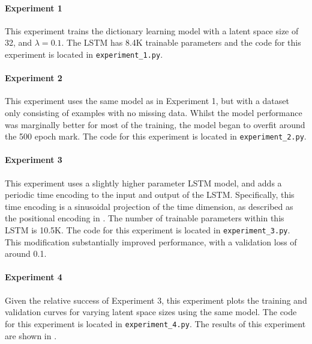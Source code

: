 \documentclass[twocolumn, 9pt]{extarticle}
\begin{document}
\paragraph{Experiment 1} This experiment trains the dictionary learning model with a latent space size of 32, and $\lambda = 0.1$. The LSTM has 8.4K trainable parameters and the code for this experiment is located in \texttt{experiment\_1.py}.

\paragraph{Experiment 2} This experiment uses the same model as in Experiment 1, but with a dataset only consisting of examples with no missing data. Whilst the model performance was marginally better for most of the training, the model began to overfit around the 500 epoch mark. The code for this experiment is located in \texttt{experiment\_2.py}.

\paragraph{Experiment 3} This experiment uses a slightly higher parameter LSTM model, and adds a periodic time encoding to the input and output of the LSTM. Specifically, this time encoding is a sinusoidal projection of the time dimension, as described as the positional encoding in \cite{vaswani2017attention}. The number of trainable parameters within this LSTM is 10.5K. The code for this experiment is located in \texttt{experiment\_3.py}. This modification substantially improved performance, with a validation loss of around 0.1.

\paragraph{Experiment 4} Given the relative success of Experiment 3, this experiment plots the training and validation curves for varying latent space sizes using the same model. The code for this experiment is located in \texttt{experiment\_4.py}. The results of this experiment are shown in .
\end{document}
